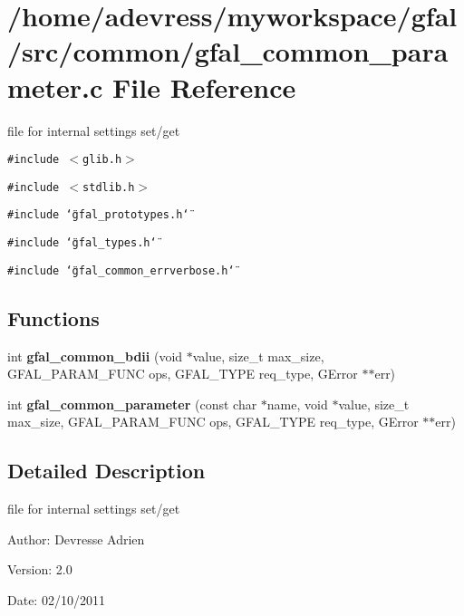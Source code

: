 \section{/home/adevress/myworkspace/gfal/src/common/gfal\_\-common\_\-parameter.c File Reference}
\label{gfal__common__parameter_8c}
file for internal settings set/get 

{\tt \#include $<$glib.h$>$}\par
{\tt \#include $<$stdlib.h$>$}\par
{\tt \#include \char`\"{}gfal\_\-prototypes.h\char`\"{}}\par
{\tt \#include \char`\"{}gfal\_\-types.h\char`\"{}}\par
{\tt \#include \char`\"{}gfal\_\-common\_\-errverbose.h\char`\"{}}\par
\subsection*{Functions}
\begin{CompactItemize}
\item 
int \textbf{gfal\_\-common\_\-bdii} (void $\ast$value, size\_\-t max\_\-size, GFAL\_\-PARAM\_\-FUNC ops, GFAL\_\-TYPE req\_\-type, GError $\ast$$\ast$err)\label{gfal__common__parameter_8c_49158a5e865fbb262db8b2dae84b7e2a}

\item 
int \textbf{gfal\_\-common\_\-parameter} (const char $\ast$name, void $\ast$value, size\_\-t max\_\-size, GFAL\_\-PARAM\_\-FUNC ops, GFAL\_\-TYPE req\_\-type, GError $\ast$$\ast$err)\label{gfal__common__parameter_8c_868b0b6b628b4f7b1cd09bd41522a4a2}

\end{CompactItemize}


\subsection{Detailed Description}
file for internal settings set/get 

\begin{Desc}
\item[Author:]Devresse Adrien \end{Desc}
\begin{Desc}
\item[Version:]2.0 \end{Desc}
\begin{Desc}
\item[Date:]02/10/2011 \end{Desc}
